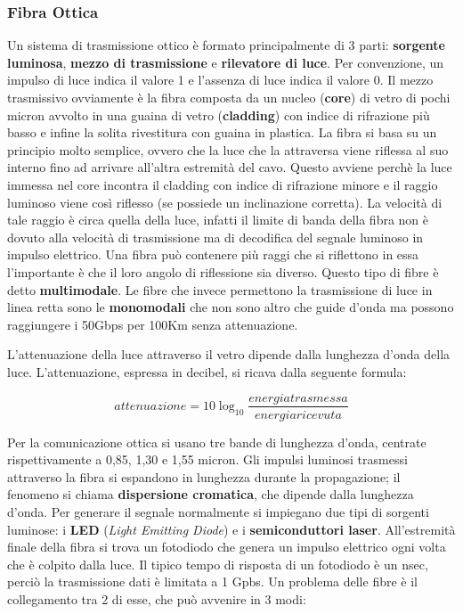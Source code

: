\subsubsection{Fibra Ottica}

Un sistema di trasmissione ottico è formato principalmente di 3 parti: \textbf{sorgente luminosa}, \textbf{mezzo di trasmissione} e \textbf{rilevatore di luce}. Per convenzione, un impulso di luce indica il valore 1 e l'assenza di luce indica il valore 0. Il mezzo trasmissivo ovviamente è la fibra composta da un nucleo (\textbf{core}) di vetro di pochi micron avvolto in una guaina di vetro (\textbf{cladding}) con indice di rifrazione più basso e infine la solita rivestitura con guaina in plastica. La fibra si basa su un principio molto semplice, ovvero che la luce che la attraversa viene riflessa al suo interno fino ad arrivare all'altra estremità del cavo. Questo avviene perchè la luce immessa nel core incontra il cladding con indice di rifrazione minore e il raggio luminoso viene così riflesso (se possiede un inclinazione corretta). La velocità di tale raggio è circa quella della luce, infatti il limite di banda della fibra non è dovuto alla velocità di trasmissione ma di decodifica del segnale luminoso in impulso elettrico. Una fibra può contenere più raggi che si riflettono in essa l'importante è che il loro angolo di riflessione sia diverso. Questo tipo di fibre è detto \textbf{multimodale}. Le fibre che invece permettono la trasmissione di luce in linea retta sono le \textbf{monomodali} che non sono altro che guide d'onda ma possono raggiungere i 50Gbps per 100Km senza attenuazione.

L'attenuazione della luce attraverso il vetro dipende dalla lunghezza d'onda della luce. L'attenuazione, espressa in decibel, si ricava dalla seguente formula:

$$attenuazione = 10\log_{10} \frac{energia trasmessa}{energia ricevuta} $$

Per la comunicazione ottica si usano tre bande di lunghezza d'onda, centrate rispettivamente a 0,85, 1,30 e 1,55 micron. Gli impulsi luminosi trasmessi attraverso la fibra si espandono in lunghezza durante la propagazione; il fenomeno si chiama \textbf{dispersione cromatica}, che dipende dalla lunghezza d'onda. 
\linebreak
\linebreak
Per generare il segnale normalmente si impiegano due tipi di sorgenti luminose: i \textbf{LED} (\textit{Light Emitting Diode}) e i \textbf{semiconduttori laser}. All'estremità finale della fibra si trova un fotodiodo che genera un impulso elettrico ogni volta che è colpito dalla luce. Il tipico tempo di risposta di un fotodiodo è un nsec, perciò la trasmissione dati è limitata a 1 Gpbs.
\linebreak
\linebreak
Un problema delle fibre è il collegamento tra 2 di esse, che può avvenire in 3 modi:

